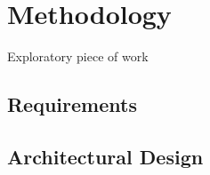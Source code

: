 \section{Methodology}
Exploratory piece of work
\subsection{Requirements}
\subsection{Architectural Design}
